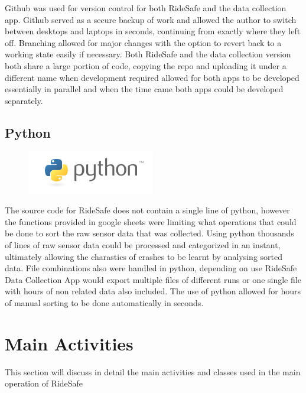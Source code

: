 Github was used for version control for both RideSafe and the data collection app. Github served as a secure backup of work and allowed the author to switch between desktops and laptops in seconds, continuing from exactly where they left off. Branching allowed for major changes with the option to revert back to a working state easily if necessary. Both RideSafe and the data collection version both share a large portion of code, copying the repo and uploading it under a different name when development required allowed for both apps to be developed essentially in parallel and when the time came both apps could be developed separately.   


\subsection{Python}
\begin{figure}
\begin{center}
\includegraphics[scale = 0.5] {implementation/python-logo.png}
\end{center}

\label{python}
\end{figure}

The source code for RideSafe does not contain a single line of python, however the functions provided in google sheets were limiting what operations that could be done to sort the raw sensor data that was collected. Using python thousands of lines of raw sensor data could be processed and categorized in an instant, ultimately allowing the charastics of crashes to be learnt by analysing sorted data. File combinations also were handled in python, depending on use RideSafe Data Collection App would export multiple files of different runs or one single file with hours of non related data also included. The use of python allowed for hours of manual sorting to be done automatically in seconds.


\section{Main Activities}

This section will discuss in detail the main activities and classes used in the main operation of RideSafe
